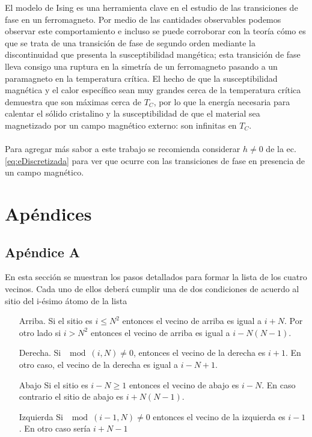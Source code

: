 \documentclass[11pt,a4paper]{article}
\begin{document}
El modelo de Ising es una herramienta clave en el estudio de las transiciones de fase en un ferromagneto. Por medio de las cantidades observables podemos observar este comportamiento e incluso se puede corroborar con la teoría cómo es que se trata de una transición de fase de segundo orden mediante la discontinuidad que presenta la susceptibilidad mangética; esta transición de fase lleva consigo una ruptura en la simetría de un ferromagneto pasando a un paramagneto en la temperatura crítica. El hecho de que la susceptibilidad magnética y el calor específico sean muy grandes cerca de la temperatura crítica demuestra que son máximas cerca de $T_C$, por lo que la energía necesaria para calentar el sólido cristalino y la susceptibilidad de que el material sea magnetizado por un campo magnético externo: son infinitas en $T_C$.\\
\\
Para agregar más sabor a este trabajo se recomienda considerar $h\neq0$ de la ec. \ref{eq:eDiscretizada} para ver que ocurre con las transiciones de fase en presencia de un campo magnético. 


\section{Apéndices}

\subsection{Apéndice A}\label{apendice1}

En esta sección se muestran los pasos detallados para formar la lista de los cuatro vecinos. Cada uno de ellos deberá cumplir una de dos condiciones de acuerdo al sitio del i-ésimo átomo de la lista
\begin{itemize}
\item[Arriba.] Si el sitio es $i\leq N^2$ entonces el vecino de arriba es igual a  $i+N$. Por otro lado si $i>N^2$ entonces el vecino de arriba es igual a $i-N(N-1)$.
\item[Derecha.] Si $\mod(i,N)\neq 0$, entonces el vecino de la derecha es $i+1$. En otro caso, el vecino de la derecha es igual a $i-N+1$.
\item[Abajo] Si el sitio es $i-N\geq 1$ entonces el vecino de abajo es $i-N$. En caso contrario el sitio de abajo es $i+N(N-1)$.
\item[Izquierda] Si $\mod(i-1,N)\neq 0$ entonces el vecino de la izquierda es $i-1$. En otro caso sería $i+N-1$
\end{itemize}
\end{document}
